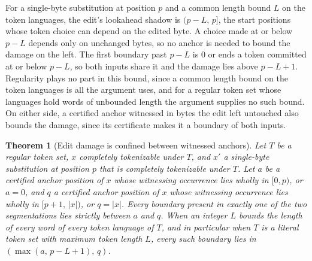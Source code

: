 \documentclass[11pt,a4paper]{article}
\theoremstyle{definition}
\theoremstyle{plain}
\newtheorem{theorem}{Theorem}
\begin{document}
For a single-byte substitution at position $p$ and a common length bound $L$ on the token languages, the edit's
lookahead shadow is $(p - L,\, p]$, the start positions whose token choice can depend on the edited byte. A choice made
at or below $p - L$ depends only on unchanged bytes, so no anchor is needed to bound the damage on the left. The first
boundary past $p - L$ is $0$ or ends a token committed at or below $p - L$, so both inputs share it and the damage lies
above $p - L + 1$. Regularity plays no part in this bound, since a common length bound on the token languages is all the
argument uses, and for a regular token set whose languages hold words of unbounded length the argument supplies no such
bound. On either side, a certified anchor witnessed in bytes the edit left untouched also bounds the damage, since its
certificate makes it a boundary of both inputs.

\begin{theorem}[Edit damage is confined between witnessed anchors]\label{thm:edit}
Let $T$ be a regular token set, $x$ completely tokenizable under $T$, and $x'$ a single-byte substitution at position
$p$ that is completely tokenizable under $T$. Let $a$ be a certified anchor position of $x$ whose witnessing occurrence
lies wholly in $[0, p)$, or $a = 0$, and $q$ a certified anchor position of $x$ whose witnessing occurrence lies wholly
in $[p+1,\, |x|)$, or $q = |x|$. Every boundary present in exactly one of the two segmentations lies strictly between
$a$ and $q$. When an integer $L$ bounds the length of every word of every token language of $T$, and in particular when
$T$ is a literal token set with maximum token length $L$, every such boundary lies in $(\max(a,\, p - L + 1),\, q)$.
\end{theorem}
\end{document}
